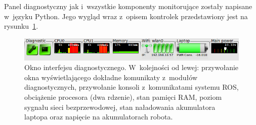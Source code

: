 Panel diagnostyczny jak i~wszystkie komponenty monitorujące zostały napisane 
w~języku Python. Jego wygląd wraz z~opisem kontrolek przedstawiony jest na
rysunku~\ref{fig:elektron_dashboard}.

\begin{figure}[htb!]
\centering
\includegraphics[width=13cm]{../../Common/img/ros/elektron_dashboard}
\caption[Okno interfejsu diagnostycznego]{Okno interfejsu diagnostycznego. 
W~kolejności od lewej: przywołanie okna wyświetlającego dokładne komunikaty
z~modułów diagnostycznych, przywołanie
konsoli z~komunikatami systemu ROS, obciążenie procesora (dwa rdzenie), stan
pamięci RAM, poziom sygnału sieci bezprzewodowej, stan naładowania akumulatora
laptopa oraz napięcie na akumulatorach robota.}
\label{fig:elektron_dashboard}
\end{figure}

